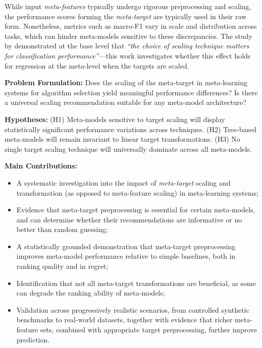 \documentclass[12pt]{article}
\begin{document}
While input \textit{meta-features} typically undergo rigorous preprocessing and scaling, the performance scores forming the \textit{meta-target} are typically used in their raw form. Nonetheless, metrics such as macro-F1 vary in scale and distribution across tasks, which can hinder meta-models sensitive to these discrepancies. The study by \cite{amorim2022choice} demonstrated at the base level that \textit{``the choice of scaling technique matters for classification performance''}---this work investigates whether this effect holds for regression at the meta-level when the targets are scaled.

\textbf{Problem Formulation:} Does the scaling of the meta-target in meta-learning systems for algorithm selection yield meaningful performance differences? Is there a universal scaling recommendation suitable for any meta-model architecture?

\textbf{Hypotheses:} (H1) Meta-models sensitive to target scaling will display statistically significant performance variations across techniques. (H2) Tree-based meta-models will remain invariant to linear target transformations. (H3) No single target scaling technique will universally dominate across all meta-models.

\textbf{Main Contributions:}
\begin{itemize}
  \item A systematic investigation into the impact of \textit{meta-target} scaling and transformation (as opposed to meta-feature scaling) in meta-learning systems;
  \item Evidence that meta-target preprocessing is essential for certain meta-models, and can determine whether their recommendations are informative or no better than random guessing;
  \item A statistically grounded demonstration that meta-target preprocessing improves meta-model performance relative to simple baselines, both in ranking quality and in regret;
  \item Identification that not all meta-target transformations are beneficial, as some can degrade the ranking ability of meta-models;
  \item Validation across progressively realistic scenarios, from controlled synthetic benchmarks to real-world datasets, together with evidence that richer meta-feature sets, combined with appropriate target preprocessing, further improve prediction.
\end{itemize}

\end{document}
